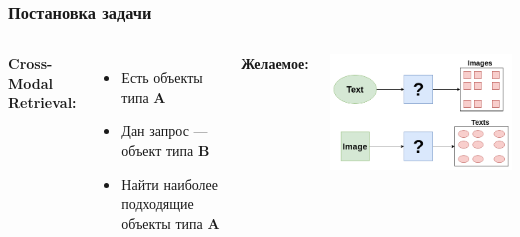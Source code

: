 \documentclass{beamer}
\begin{document}
\begin{frame}
	\frametitle{Постановка задачи}
	\begin{columns}[c]
		\textbf{Cross-Modal Retrieval:}
		\begin{itemize}
			\item Есть объекты типа \textbf{A}
			\item Дан запрос --- объект типа \textbf{B}
			\item Найти наиболее подходящие объекты типа \textbf{A}
		\end{itemize}
	
		\textbf{Желаемое:}
		\centerline{\includegraphics[scale=0.28]{images/desired.png}}
		

\end{columns}
\end{frame}
\end{document}
